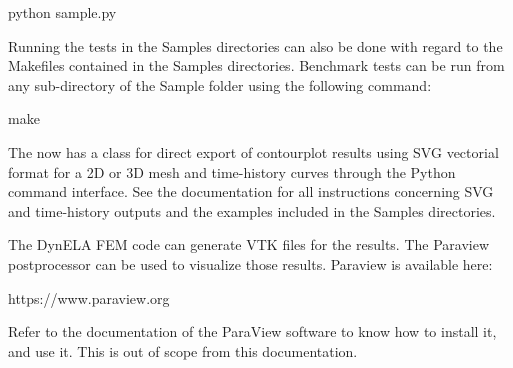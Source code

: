 \begin{BashListing}[numbers=none]
python sample.py
\end{BashListing}

Running the tests in the Samples directories can also be done with regard to the Makefiles contained in the Samples directories. Benchmark tests can be run from any sub-directory of the Sample folder using the following command:

\begin{BashListing}[numbers=none]
make
\end{BashListing}

The \DynELA now has a class for direct export of contourplot results using SVG vectorial format for a 2D or 3D mesh and time-history curves through the Python command interface. See the documentation for all instructions concerning SVG and time-history outputs and the examples included in the Samples directories.

The DynELA FEM code can generate VTK files for the results. The Paraview postprocessor can be used to visualize those results. Paraview is available here:

\hspace*{1cm}\textsf{\hspace*{1cm}\textsf{https://www.paraview.org}}

Refer to the documentation of the ParaView software to know how to install it, and use it. This is out of scope from this documentation.
